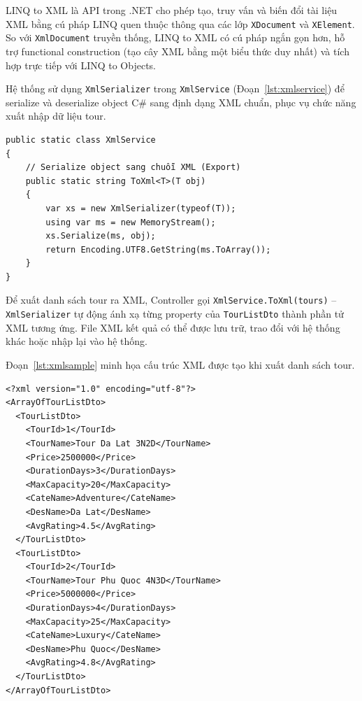 \begin{de}\label{def3.12}
LINQ to XML là API trong .NET cho phép tạo, truy vấn và biến
đổi tài liệu XML bằng cú pháp LINQ quen thuộc thông qua các
lớp \texttt{XDocument} và \texttt{XElement}. So với
\texttt{XmlDocument} truyền thống, LINQ to XML có cú pháp
ngắn gọn hơn, hỗ trợ functional construction (tạo cây XML
bằng một biểu thức duy nhất) và tích hợp trực tiếp với
LINQ to Objects.
\end{de}

Hệ thống sử dụng \texttt{XmlSerializer} trong
\texttt{XmlService} (Đoạn~\ref{lst:xmlservice}) để
serialize và deserialize object C\# sang định dạng XML
chuẩn, phục vụ chức năng xuất nhập dữ liệu tour.

\begin{lstlisting}[style=csharp,
  caption={XmlService -- Export và Import dữ liệu XML},
  label={lst:xmlservice}]
public static class XmlService
{
    // Serialize object sang chuỗi XML (Export)
    public static string ToXml<T>(T obj)
    {
        var xs = new XmlSerializer(typeof(T));
        using var ms = new MemoryStream();
        xs.Serialize(ms, obj);
        return Encoding.UTF8.GetString(ms.ToArray());
    }
}
\end{lstlisting}

\begin{ex}\label{ex3.1}
Để xuất danh sách tour ra XML, Controller gọi
\texttt{XmlService.ToXml(tours)} -- \texttt{XmlSerializer}
tự động ánh xạ từng property của \texttt{TourListDto} thành
phần tử XML tương ứng. File XML kết quả có thể được lưu
trữ, trao đổi với hệ thống khác hoặc nhập lại vào hệ thống.
\end{ex}

Đoạn~\ref{lst:xmlsample} minh họa cấu trúc XML được tạo
khi xuất danh sách tour.

\begin{lstlisting}[style=sql,
  caption={Cấu trúc file XML xuất từ hệ thống},
  label={lst:xmlsample}]
<?xml version="1.0" encoding="utf-8"?>
<ArrayOfTourListDto>
  <TourListDto>
    <TourId>1</TourId>
    <TourName>Tour Da Lat 3N2D</TourName>
    <Price>2500000</Price>
    <DurationDays>3</DurationDays>
    <MaxCapacity>20</MaxCapacity>
    <CateName>Adventure</CateName>
    <DesName>Da Lat</DesName>
    <AvgRating>4.5</AvgRating>
  </TourListDto>
  <TourListDto>
    <TourId>2</TourId>
    <TourName>Tour Phu Quoc 4N3D</TourName>
    <Price>5000000</Price>
    <DurationDays>4</DurationDays>
    <MaxCapacity>25</MaxCapacity>
    <CateName>Luxury</CateName>
    <DesName>Phu Quoc</DesName>
    <AvgRating>4.8</AvgRating>
  </TourListDto>
</ArrayOfTourListDto>
\end{lstlisting}

